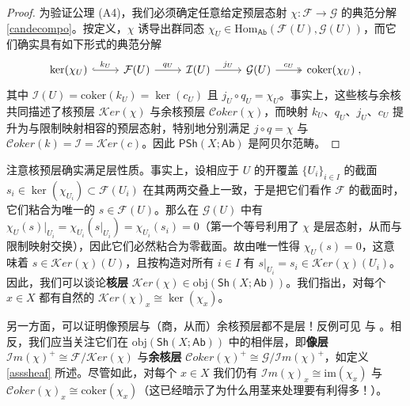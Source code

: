 \begin{proof}
为验证公理 (A4)，我们必须确定任意给定预层态射 $\chi:\mathcal{F}\rightarrow\mathcal{G}$ 的典范分解 \eqref{candecompo}。按定义，$\chi$ 诱导出群同态 $\chi_U\in\text{Hom}_\mathsf{Ab}(\mathcal{F}(U),\mathcal{G}(U))$，而它们确实具有如下形式的典范分解
\[
\begin{tikzcd}
	\ker(\chi_U)\arrow[r, hook, "k_U"] & \mathcal{F}(U)\arrow[r, "q_U"] & \mathcal{I}(U)\arrow[r, "j_U"] & \mathcal{G}(U)\arrow[r, two heads, "c_U"] & \text{coker}(\chi_U)\;,
\end{tikzcd}
\]
其中 $\mathcal{I}(U)=\text{coker}(k_U)=\ker(c_U)$ 且 $j_U\circ q_U=\chi_U$。事实上，这些核与余核共同描述了核预层 $\mathcal{K}er(\chi)$ 与余核预层 $\mathcal{C}oker(\chi)$，而映射 $k_U$、$q_U$、$j_U$、$c_U$ 提升为与限制映射相容的预层态射，特别地分别满足 $j\circ q=\chi$ 与 $\mathcal{C}oker(k)=\mathcal{I}=\mathcal{K}er(c)$。因此 $\mathsf{PSh}(X;\mathsf{Ab})$ 是阿贝尔范畴。
\end{proof}

\begin{Rem}
注意核预层确实满足层性质。事实上，设相应于 $U$ 的开覆盖 $\{U_i\}_{i\in I}$ 的截面 $s_i\in\ker(\chi_{U_i})\subset\mathcal{F}(U_i)$ 在其两两交叠上一致，于是把它们看作 $\mathcal{F}$ 的截面时，它们粘合为唯一的 $s\in\mathcal{F}(U)$。那么在 $\mathcal{G}(U)$ 中有 $\chi_U(s)|_{U_i}=\chi_{U_i}(s|_{U_i})=\chi_{U_i}(s_i)=0$（第一个等号利用了 $\chi$ 是层态射，从而与限制映射交换），因此它们必然粘合为零截面。故由唯一性得 $\chi_U(s)=0$，这意味着 $s\in\mathcal{K}er(\chi)(U)$，且按构造对所有 $i\in I$ 有 $s|_{U_i}=s_i\in\mathcal{K}er(\chi)(U_i)$。因此，我们可以谈论\textbf{核层} $\mathcal{K}er(\chi)\in\text{obj}(\mathsf{Sh}(X;\mathsf{Ab}))$。我们指出，对每个 $x\in X$ 都有自然的 $\mathcal{K}er(\chi)_x\cong\ker(\chi_x)$。

另一方面，可以证明像预层与（商，从而）余核预层都不是层！反例可见 \cite[construction 13.12]{[Gat20]} 与 \cite[Proposition I.5.4.b]{[GM03]}。相反，我们应当关注它们在 $\text{obj}(\mathsf{Sh}(X;\mathsf{Ab}))$ 中的相伴层，即\textbf{像层} $\mathcal{I}m(\chi)^+\cong\mathcal{F}/\mathcal{K}er(\chi)$ 与\textbf{余核层} $\mathcal{C}oker(\chi)^+\cong\mathcal{G}/\mathcal{I}m(\chi)^+$，如定义 \ref{asssheaf} 所述。尽管如此，对每个 $x\in X$ 我们仍有 $\mathcal{I}m(\chi)_x\cong\text{im}(\chi_x)$ 与 $\mathcal{C}oker(\chi)_x\cong\text{coker}(\chi_x)$（这已经暗示了为什么用茎来处理要有利得多！）。
\end{Rem}

